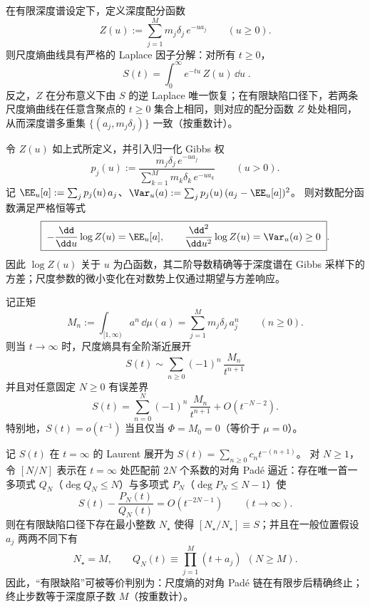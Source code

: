 \begin{proposition}\label{prop:xi-scale-entropy-laplace-stieltjes-completeness}
在有限深度谱设定下，定义深度配分函数
\[
Z(u):=\sum_{j=1}^{M} m_j\delta_j\,e^{-u a_j}
\qquad (u\ge 0).
\]
则尺度熵曲线具有严格的 Laplace 因子分解：对所有 \(t\ge 0\)，
\[
\boxed{\;
S(t)=\int_{0}^{\infty}e^{-t u}\,Z(u)\,\dd u\; }.
\]
反之，\(Z\) 在分布意义下由 \(S\) 的逆 Laplace 唯一恢复；在有限缺陷口径下，若两条尺度熵曲线在任意含聚点的 \(t\ge 0\) 集合上相同，则对应的配分函数 \(Z\) 处处相同，从而深度谱多重集 \(\{(a_j,m_j\delta_j)\}\) 一致（按重数计）。
\end{proposition}

\begin{proposition}
令 \(Z(u)\) 如上式所定义，并引入归一化 Gibbs 权
\[
p_j(u):=\frac{m_j\delta_j\,e^{-u a_j}}{\sum_{k=1}^{M}m_k\delta_k\,e^{-u a_k}}
\qquad (u>0).
\]
记 \(\EE_u[a]:=\sum_j p_j(u)\,a_j\)、\(\Var_u(a):=\sum_j p_j(u)\,(a_j-\EE_u[a])^2\)。
则对数配分函数满足严格恒等式
\[
\boxed{\;
-\frac{\dd}{\dd u}\log Z(u)=\EE_u[a],\qquad
\frac{\dd^2}{\dd u^2}\log Z(u)=\Var_u(a)\ge 0\; }.
\]
因此 \(\log Z(u)\) 关于 \(u\) 为凸函数，其二阶导数精确等于深度谱在 Gibbs 采样下的方差；尺度参数的微小变化在对数势上仅通过期望与方差响应。
\end{proposition}

\begin{proposition}
记正矩
\[
M_n:=\int_{[1,\infty)}a^{n}\,\dd\mu(a)=\sum_{j=1}^{M}m_j\delta_j\,a_j^{n}
\qquad (n\ge 0).
\]
则当 \(t\to\infty\) 时，尺度熵具有全阶渐近展开
\[
\boxed{\;
S(t)\sim \sum_{n\ge0}(-1)^n\,\frac{M_n}{t^{n+1}}\;}
\]
并且对任意固定 \(N\ge 0\) 有误差界
\[
S(t)=\sum_{n=0}^{N}(-1)^n\,\frac{M_n}{t^{n+1}}+O(t^{-N-2}).
\]
特别地，\(S(t)=o(t^{-1})\) 当且仅当 \(\Phi=M_0=0\)（等价于 \(\mu=0\)）。
\end{proposition}

\begin{proposition}
记 \(S(t)\) 在 \(t=\infty\) 的 Laurent 展开为 \(S(t)=\sum_{n\ge0}c_n t^{-(n+1)}\)。
对 \(N\ge 1\)，令 \([N/N]\) 表示在 \(t=\infty\) 处匹配前 \(2N\) 个系数的对角 Pad\'e 逼近：存在唯一首一多项式 \(Q_N\)（\(\deg Q_N\le N\)）与多项式 \(P_N\)（\(\deg P_N\le N-1\)）使
\[
S(t)-\frac{P_N(t)}{Q_N(t)}=O(t^{-2N-1})\qquad (t\to\infty).
\]
则在有限缺陷口径下存在最小整数 \(N_\star\) 使得 \([N_\star/N_\star]\equiv S\)；并且在一般位置假设 \(a_j\) 两两不同下有
\[
\boxed{\;N_\star=M,\qquad Q_N(t)\equiv \prod_{j=1}^{M}(t+a_j)\ \ (N\ge M).\;}
\]
因此，“有限缺陷”可被等价判别为：尺度熵的对角 Pad\'e 链在有限步后精确终止；终止步数等于深度原子数 \(M\)（按重数计）。
\end{proposition}

